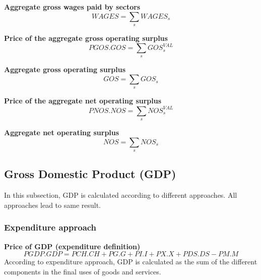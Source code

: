 \documentclass[12pt]{article}
\numberwithin{equation}{section}
\begin{document}
\noindent\textbf{Aggregate gross wages paid by sectors} \\
\begin{dmath}
WAGES = \sum_{s} WAGES_{s}
\end{dmath}


\noindent\textbf{Price of the aggregate gross operating surplus} \\
\begin{dmath}
PGOS . GOS = \sum_{s} GOS^{VAL}_{s}
\end{dmath}

\noindent\textbf{Aggregate gross operating surplus} \\
\begin{dmath}
GOS = \sum_{s} GOS_{s}
\end{dmath}

\noindent\textbf{Price of the aggregate net operating surplus} \\
\begin{dmath}
PNOS . NOS = \sum_{s} NOS^{VAL}_{s}
\end{dmath}

\noindent\textbf{Aggregate net operating surplus} \\
\begin{dmath}
NOS = \sum_{s} NOS_{s}
\end{dmath}



\subsection{Gross Domestic Product (GDP)}



In this subsection, GDP is calculated according to different approaches. All approaches lead to same result.



\subsubsection{Expenditure approach}



\noindent\textbf{Price of GDP (expenditure definition)} \\
\begin{dmath}
PGDP . GDP = PCH . CH + PG . G + PI . I + PX . X + PDS . DS - PM . M
\end{dmath}
According to expenditure approach, GDP is calculated as the sum of the different components in the final uses of goods and services. \\
\end{document}
